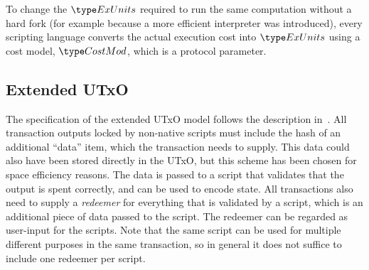 To change the $\ExUnits$ required to
run the same computation without a hard fork (for example because a
more efficient interpreter was introduced), every scripting language
converts the actual execution cost into $\ExUnits$ using a cost model,
$\CostMod$, which is a protocol parameter.

\subsection{Extended UTxO}

The specification of the extended UTxO model follows the description in~\cite{plutus_eutxo}.
All transaction outputs locked by non-native scripts must include the hash of an additional ``data'' item, which the transaction needs to supply. This data could also have been stored directly in the UTxO, but this scheme has been chosen for space efficiency reasons. The data is passed to a script that validates that the output is spent correctly, and can be used to encode state.
All transactions also need to supply a \emph{redeemer} for everything that is validated by a script, which is an additional piece of data passed to the script. The redeemer can be regarded as user-input for the scripts. Note that the same script can be used for multiple different purposes in the same transaction, so in general it does not suffice to include one redeemer per script.
